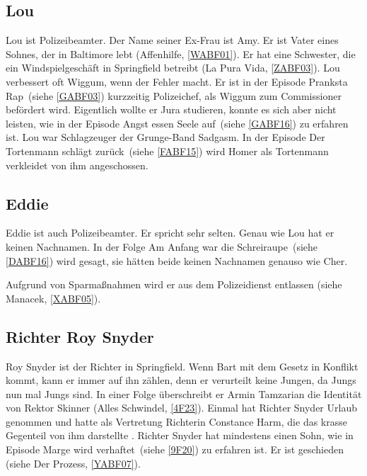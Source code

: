 \subsection{Lou}\label{Lou}
Lou ist Polizeibeamter. Der Name seiner Ex-Frau ist Amy. Er ist Vater eines Sohnes, der in Baltimore lebt (\glqq Affenhilfe\grqq, \ref{WABF01}). Er hat eine Schwester, die ein Windspielgeschäft in Springfield betreibt (\glqq La Pura Vida\grqq, \ref{ZABF03}). Lou verbessert oft Wiggum, wenn der Fehler macht. Er ist in der Episode \glqq Pranksta Rap\grqq\ (siehe \ref{GABF03}) kurzzeitig Polizeichef, als Wiggum zum Commissioner befördert wird. Eigentlich wollte er Jura studieren, konnte es sich aber nicht leisten, wie in der Episode \glqq Angst essen Seele auf\grqq\ (siehe \ref{GABF16}) zu erfahren ist. Lou war Schlagzeuger der Grunge-Band \glqq Sadgasm\grqq . In der Episode \glqq Der Tortenmann schlägt zurück\grqq\ (siehe \ref{FABF15}) wird Homer als Tortenmann verkleidet von ihm angeschossen.

\subsection{Eddie}\label{Eddie}
Eddie ist auch Polizeibeamter. Er spricht sehr selten. Genau wie Lou hat er keinen Nachnamen. In der Folge \glqq Am Anfang war die Schreiraupe\grqq\ (siehe \ref{DABF16}) wird gesagt, sie hätten beide keinen Nachnamen genauso wie Cher.

Aufgrund von Sparmaßnahmen wird er aus dem Polizeidienst entlassen (siehe \glqq Manacek\grqq, \ref{XABF05}).

\subsection{Richter Roy Snyder}\label{RichterSynder}
Roy Snyder ist der Richter in Springfield. Wenn Bart mit dem Gesetz in Konflikt kommt, kann er immer auf ihn zählen, denn er verurteilt keine Jungen, \glqq da Jungs nun mal Jungs sind\grqq . In einer Folge überschreibt er Armin Tamzarian die Identität von Rektor Skinner (\glqq Alles Schwindel\grqq , \ref{4F23}). Einmal hat Richter Snyder Urlaub genommen und hatte als Vertretung Richterin Constance Harm, die das krasse Gegenteil von ihm darstellte \cite{Wikipedia}. Richter Snyder hat mindestens einen Sohn, wie in Episode \glqq Marge wird verhaftet\grqq\ (siehe \ref{9F20}) zu erfahren ist. Er ist geschieden (siehe \glqq Der Prozess\grqq, \ref{YABF07}).

